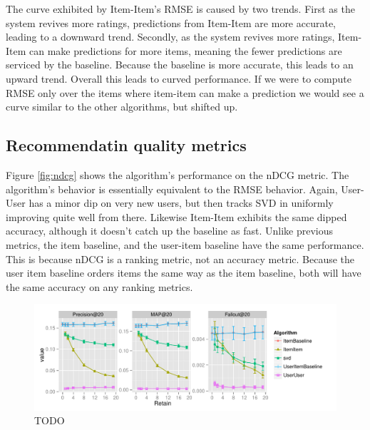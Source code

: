 \documentclass[letterpaper]{sig-alternate}
\begin{document}
  The curve exhibited by Item-Item's RMSE is caused by two trends.
  First as the system revives more ratings, predictions from Item-Item are more accurate, leading to a downward trend.
  Secondly, as the system revives more ratings, Item-Item can make predictions for more items, meaning the fewer predictions are serviced by the baseline.
  Because the baseline is more accurate, this leads to an upward trend.
  Overall this leads to curved performance.
  If we were to compute RMSE only over the items where item-item can make a prediction we would see a curve similar to the other algorithms, but shifted up.

\subsection {Recommendatin quality metrics}
  Figure \ref{fig:ndcg} shows the algorithm's performance on the nDCG metric.
  The algorithm's behavior is essentially equivalent to the RMSE behavior.
  Again, User-User has a minor dip on very new users, but then tracks SVD in uniformly improving quite well from there.
  Likewise Item-Item exhibits the same dipped accuracy, although it doesn't catch up the baseline as fast.
  Unlike previous metrics, the item baseline, and the user-item baseline have the same performance.
  This is because nDCG is a ranking metric, not an accuracy metric.
  Because the user item baseline orders items the same way as the item baseline, both will have the same accuracy on any ranking metrics.



\begin{figure}[ht!]
  \centering
  \includegraphics[width=1.1\linewidth]{../lenskit/output/ekstrandTuned20/TopNPrecision.pdf}
  \caption{TODO}
  \label{fig:map}
\end{figure}
\end{document}
